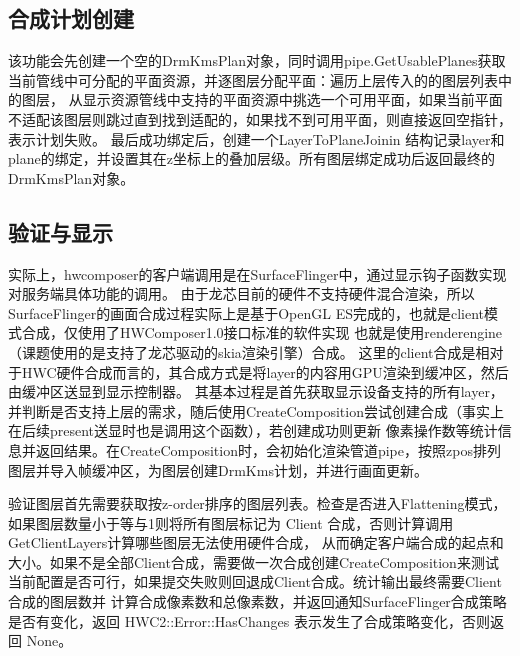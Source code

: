 \subsection{合成计划创建}
该功能会先创建一个空的DrmKmsPlan对象，同时调用pipe.GetUsablePlanes获取当前管线中可分配的平面资源，并逐图层分配平面：遍历上层传入的的图层列表中的图层，
从显示资源管线中支持的平面资源中挑选一个可用平面，如果当前平面不适配该图层则跳过直到找到适配的，如果找不到可用平面，则直接返回空指针，表示计划失败。
最后成功绑定后，创建一个LayerToPlaneJoinin 结构记录layer和plane的绑定，并设置其在z坐标上的叠加层级。所有图层绑定成功后返回最终的DrmKmsPlan对象。

\subsection{验证与显示}
实际上，hwcomposer的客户端调用是在SurfaceFlinger中，通过显示钩子函数实现对服务端具体功能的调用。
由于龙芯目前的硬件不支持硬件混合渲染，所以SurfaceFlinger的画面合成过程实际上是基于OpenGL ES完成的，也就是client模式合成，仅使用了HWComposer1.0接口标准的软件实现
也就是使用renderengine（课题使用的是支持了龙芯驱动的skia渲染引擎）合成。
这里的client合成是相对于HWC硬件合成而言的，其合成方式是将layer的内容用GPU渲染到缓冲区，然后由缓冲区送显到显示控制器。
其基本过程是首先获取显示设备支持的所有layer，并判断是否支持上层的需求，随后使用CreateComposition尝试创建合成（事实上在后续present送显时也是调用这个函数），若创建成功则更新
像素操作数等统计信息并返回结果。在CreateComposition时，会初始化渲染管道pipe，按照zpos排列图层并导入帧缓冲区，为图层创建DrmKms计划，并进行画面更新。

验证图层首先需要获取按z-order排序的图层列表。检查是否进入Flattening模式，如果图层数量小于等与1则将所有图层标记为 Client 合成，否则计算调用GetClientLayers计算哪些图层无法使用硬件合成，
从而确定客户端合成的起点和大小。如果不是全部Client合成，需要做一次合成创建CreateComposition来测试当前配置是否可行，如果提交失败则回退成Client合成。统计输出最终需要Client合成的图层数并
计算合成像素数和总像素数，并返回通知SurfaceFlinger合成策略是否有变化，返回 HWC2::Error::HasChanges 表示发生了合成策略变化，否则返回 None。 


